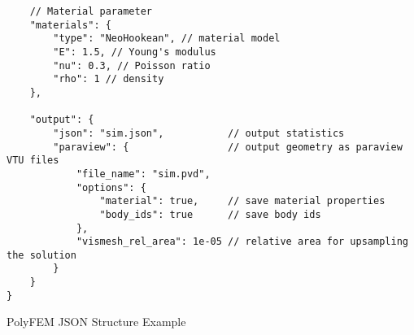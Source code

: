 \begin{appendices}
\begin{listing}
\begin{verbatim}
    // Material parameter
    "materials": {
        "type": "NeoHookean", // material model
        "E": 1.5, // Young's modulus
        "nu": 0.3, // Poisson ratio
        "rho": 1 // density
    },

    "output": {
        "json": "sim.json",           // output statistics
        "paraview": {                 // output geometry as paraview VTU files
            "file_name": "sim.pvd",
            "options": {
                "material": true,     // save material properties
                "body_ids": true      // save body ids
            },
            "vismesh_rel_area": 1e-05 // relative area for upsampling the solution
        }
    }
}
\end{verbatim}
\caption{PolyFEM JSON Structure Example \cite{polyfem-json}} 
\label{appendix:polyfem-json-structure}
\end{listing}

\end{appendices}
